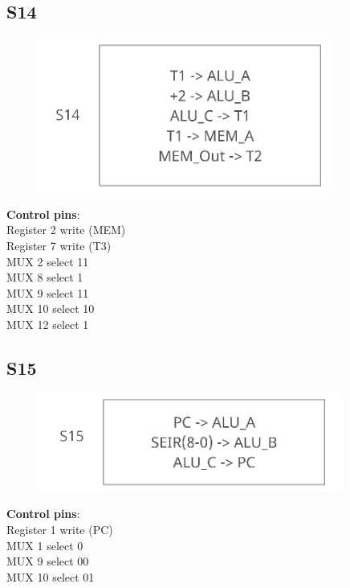 \documentclass[11pt, fleqn]{article}
\begin{document}
\subsection*{S14}
\begin{figure}[H]
    \centering
    \includegraphics{DataPath/DataPath_S14.PNG}
\end{figure}
\textbf{Control pins}: \\
Register 2 write (MEM) \\
Register 7 write (T3) \\
MUX 2 select 11 \\
MUX 8 select 1 \\
MUX 9 select 11 \\
MUX 10 select 10 \\
MUX 12 select 1 \\

\subsection*{S15}
\begin{figure}[H]
    \centering
    \includegraphics{DataPath/DataPath_S15.PNG}
\end{figure}
\textbf{Control pins}: \\
Register 1 write (PC) \\
MUX 1 select 0 \\
MUX 9 select 00 \\
MUX 10 select 01 \\
\end{document}
